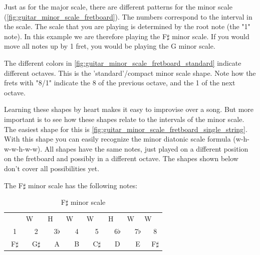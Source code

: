 \newpage

Just as for the major scale, there are different patterns for the minor scale (\autoref{fig:guitar_minor_scale_fretboard}). The numbers correspond to the interval in the scale. The scale that you are playing is determined by the root note (the "1" note). In this example we are therefore playing the F$\sharp$ minor scale. If you would move all notes up by 1 fret, you would be playing the G minor scale.

The different colors in \autoref{fig:guitar_minor_scale_fretboard_standard} indicate different octaves. This is the 'standard'/compact minor scale shape. Note how the frets with "8/1" indicate the 8 of the previous octave, and the 1 of the next octave.

Learning these shapes by heart makes it easy to improvise over a song. But more important is to see how these shapes relate to the intervals of the minor scale. The easiest shape for this is \autoref{fig:guitar_minor_scale_fretboard_single_string}. With this shape you can easily recognize the minor diatonic scale formula (w-h-w-w-h-w-w). All shapes have the same notes, just played on a different position on the fretboard and possibly in a different octave. The shapes shown below don't cover all possibilities yet.

The F$\sharp$ minor scale has the following notes:

\begin{table}[h]
	\centering
	\begin{tabular}{*{16}{c}}
		& \multicolumn{2}{P{4mm}}{\large{W}} & \multicolumn{2}{P{4mm}}{\large{H}} & \multicolumn{2}{P{4mm}}{\large{W}} & \multicolumn{2}{P{4mm}}{\large{W}} & \multicolumn{2}{P{4mm}}{\large{H}} & \multicolumn{2}{P{4mm}}{\large{W}} & \multicolumn{2}{P{4mm}}{\large{W}} & \\
		\multicolumn{2}{P{4mm}}{1} & \multicolumn{2}{P{4mm}}{2} & \multicolumn{2}{P{4mm}}{3$\flat$} & \multicolumn{2}{P{4mm}}{4} & \multicolumn{2}{P{4mm}}{5} & \multicolumn{2}{P{4mm}}{6$\flat$} & \multicolumn{2}{P{4mm}}{7$\flat$} & \multicolumn{2}{P{4mm}}{8} \\
		\multicolumn{2}{P{4mm}}{F$\sharp$} & \multicolumn{2}{P{4mm}}{G$\sharp$} & \multicolumn{2}{P{4mm}}{A} & \multicolumn{2}{P{4mm}}{B} & \multicolumn{2}{P{4mm}}{C$\sharp$} & \multicolumn{2}{P{4mm}}{D} & \multicolumn{2}{P{4mm}}{E} & \multicolumn{2}{P{4mm}}{F$\sharp$}
	\end{tabular}
	\caption{F$\sharp$ minor scale}
	\label{tab:guitar_f_sharp_minor_scale}
\end{table}

